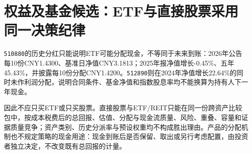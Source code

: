 \section{权益及基金候选：ETF与直接股票采用同一决策纪律}

\texttt{510880}的历史分红只能说明ETF可能分配现金，不等同于未来到账：2026年公告每10份CNY1.4300、基准日净值CNY3.1813；2025年报净值增长-0.45\%、五年45.43\%，并披露每10份分配CNY1.4200。\texttt{512890}则在2024年净值增长22.64\%的同时未作利润分配，说明合同条件、基金净值和指数股息率均不能换算为持有人下一年现金。

因此不应只买ETF或只买股票。直接股票与ETF/REIT只能在同一份跨资产比较包中，按成本税费后的总回报、估值、分配与现金流质量、风险、重叠、容量和证据质量竞争；资产类别、历史分派率与预设权重均不构成胜出理由。产品的分配机制也不规定策略的现金用途：现金到账后是否保留、取出或另行考虑配置，由投资者独立决定，不改变既有总回报的计量。
